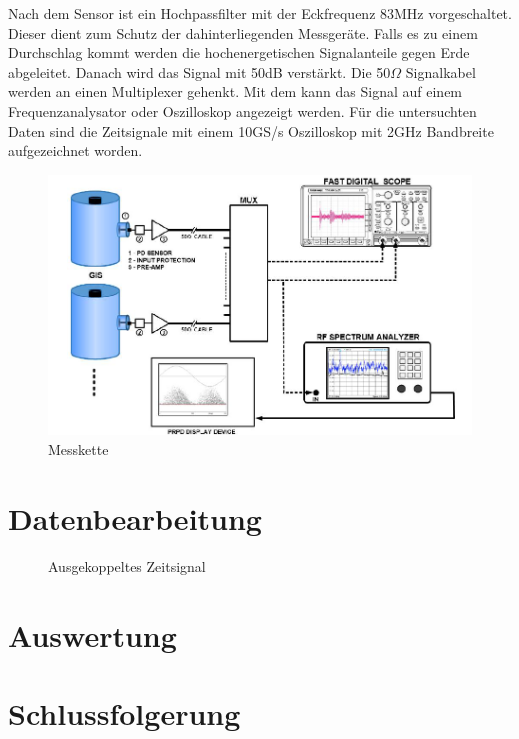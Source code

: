 \begin{refsection}
Nach dem Sensor ist ein Hochpassfilter mit der Eckfrequenz 83MHz vorgeschaltet.
Dieser dient zum Schutz der dahinterliegenden Messgeräte.
Falls es zu einem Durchschlag kommt werden die hochenergetischen Signalanteile gegen Erde abgeleitet.
Danach wird das Signal mit 50dB verstärkt.
Die 50$\Omega$ Signalkabel werden an einen Multiplexer gehenkt. 
Mit dem kann das Signal auf einem Frequenzanalysator oder Oszilloskop angezeigt werden. 
Für die untersuchten Daten sind die Zeitsignale mit einem 10GS/s Oszilloskop mit 2GHz Bandbreite aufgezeichnet worden. 
\begin{figure}[h]
	\centering
	\includegraphics[width=0.5\linewidth]{papers/gis/Bilder/MessketteAusGIS}
	\caption{Messkette \cite{report:ABBOnSite}}
	\label{fig:messketteausgis}
\end{figure}

 
\section{Datenbearbeitung}


\begin{figure}[h]
	\centering
{}

\caption{Ausgekoppeltes Zeitsignal}
\label{fig:Zeitsig}
\end{figure}


\section{Auswertung}

\section{Schlussfolgerung}

\printbibliography[heading=subbibliography]
\end{refsection}
